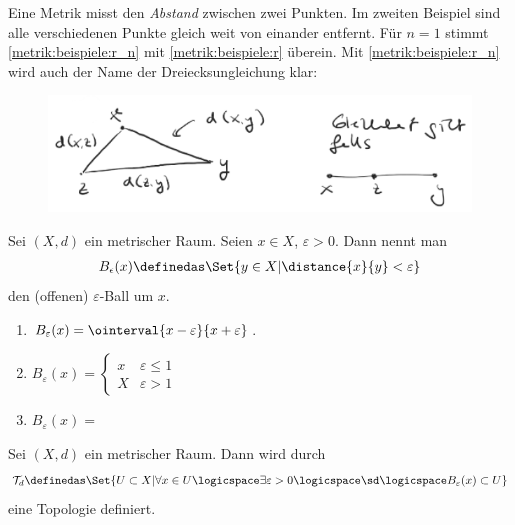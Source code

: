 Eine Metrik misst den \emph{Abstand} zwischen zwei Punkten. 
Im zweiten Beispiel sind alle verschiedenen Punkte gleich weit von einander entfernt. 
Für \( n=1 \) stimmt \ref{metrik:beispiele:r_n} mit \ref{metrik:beispiele:r} überein. 
Mit \ref{metrik:beispiele:r_n} wird auch der Name der Dreiecksungleichung klar:
\begin{figure}[H]
    \centering
    \includegraphics[width=0.8\linewidth]{figures/dreiecksungleichung_visualisierung}
    \label{fig:dreiecksungleichung_visualisierung}
\end{figure}
\begin{definition}
    Sei \( (X,d) \) ein metrischer Raum. Seien \( x\in X \), \( \varepsilon>0 \). Dann nennt man
    \begin{align*}
        B_\epsilon(x)\definedas\Set{y\in X| \distance{x}{y}<\varepsilon}
    \end{align*}
    den (offenen) \( \varepsilon \)-Ball um \( x \).
\end{definition}
\begin{beispiele*}
    \begin{enumerate}
        \item \( B_\varepsilon(x)=\ointerval{x-\varepsilon}{x+\varepsilon} \).
        \item \( B_\varepsilon(x)=\begin{cases}
            x & \varepsilon\leq 1 \\
            X & \varepsilon>1
        \end{cases}
         \)
         
        \item \( B_\varepsilon(x)= \) 
        
    \end{enumerate}
\end{beispiele*}
\begin{satz}\label{metrische_topologie}
    Sei \( (X,d) \) ein metrischer Raum. Dann wird durch
    \begin{align*}
        \mathcal{T}_d\definedas \Set{U\subset X|\forall x\in U\logicspace\exists\varepsilon>0\logicspace\text{\sd}\logicspace B_\varepsilon(x)\subset U}
    \end{align*}
    eine Topologie definiert.
\end{satz}
